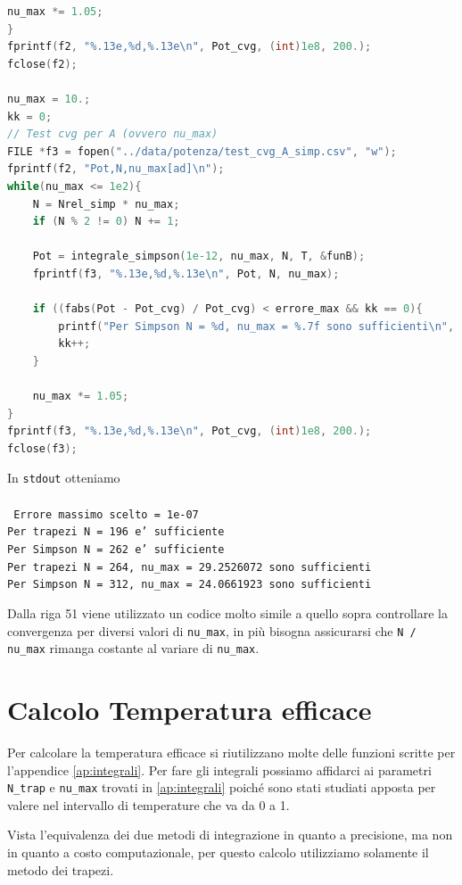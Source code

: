 \documentclass[a4paper, titlepage]{article}
\begin{document}
\begin{lstlisting}[language=C]
    nu_max *= 1.05;
}
fprintf(f2, "%.13e,%d,%.13e\n", Pot_cvg, (int)1e8, 200.);
fclose(f2);

nu_max = 10.;
kk = 0;
// Test cvg per A (ovvero nu_max)
FILE *f3 = fopen("../data/potenza/test_cvg_A_simp.csv", "w");
fprintf(f2, "Pot,N,nu_max[ad]\n");
while(nu_max <= 1e2){
    N = Nrel_simp * nu_max;
    if (N % 2 != 0) N += 1;

    Pot = integrale_simpson(1e-12, nu_max, N, T, &funB);
    fprintf(f3, "%.13e,%d,%.13e\n", Pot, N, nu_max);

    if ((fabs(Pot - Pot_cvg) / Pot_cvg) < errore_max && kk == 0){
        printf("Per Simpson N = %d, nu_max = %.7f sono sufficienti\n", N, nu_max);
        kk++;
    }

    nu_max *= 1.05;
}
fprintf(f3, "%.13e,%d,%.13e\n", Pot_cvg, (int)1e8, 200.);
fclose(f3);
\end{lstlisting}

In \texttt{stdout} otteniamo \\ \\
\texttt{
Errore massimo scelto = 1e-07 \\
Per trapezi N = 196 e' sufficiente \\
Per Simpson N = 262 e' sufficiente \\
Per trapezi N = 264, nu\_max = 29.2526072 sono sufficienti \\
Per Simpson N = 312, nu\_max = 24.0661923 sono sufficienti \\
}

Dalla riga 51 viene utilizzato un codice molto simile a quello sopra controllare la convergenza per diversi valori di \texttt{nu\_max}, in più bisogna assicurarsi che \texttt{N / nu\_max} rimanga costante al variare di \texttt{nu\_max}.


\section{Calcolo Temperatura efficace} \label{ap:Teff}

Per calcolare la temperatura efficace si riutilizzano molte delle funzioni scritte per l'appendice \ref{ap:integrali}.
Per fare gli integrali possiamo affidarci ai parametri \texttt{N\_trap} e \texttt{nu\_max} trovati in \ref{ap:integrali} poiché sono stati studiati apposta per valere nel intervallo di temperature che va da 0 a 1.

Vista l'equivalenza dei due metodi di integrazione in quanto a precisione, ma non in quanto a costo computazionale, per questo calcolo utilizziamo solamente il metodo dei trapezi.
\end{document}
